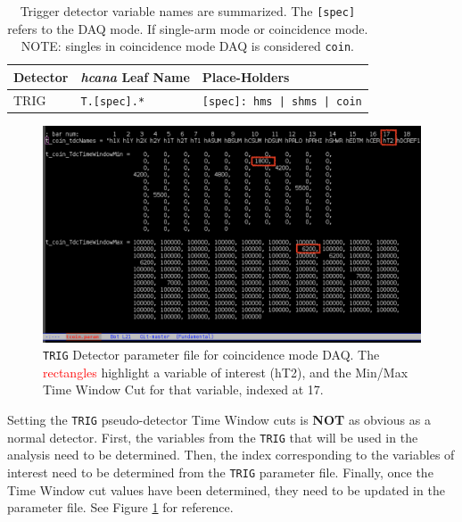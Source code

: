 \documentclass[14pt]{article}
\begin{document}
\begin{table}[h!]
\begin{tabular}{l l l}
\textbf{Detector} & \textit{hcana} \textbf{Leaf Name} & \textbf{Place-Holders} \\
\hline
TRIG & \texttt{T.[spec].*} & \texttt{[spec]: hms | shms | coin} \\
\end{tabular}
\caption{Trigger detector variable names are summarized. The \texttt{[spec]} refers to the DAQ mode. If single-arm mode or coincidence mode. NOTE: singles in
coincidence mode DAQ is considered \texttt{coin}.}
\label{tab: Table 6}
\end{table} 
\begin{figure}[H]
  \captionsetup{justification=raggedright,singlelinecheck=false}
  \includegraphics[scale=0.3]{plots/tcoin_parm.png}
  \caption{\texttt{TRIG} Detector parameter file for coincidence mode DAQ. The \textcolor{red}{rectangles} highlight a variable of interest (hT2), and the Min/Max
  Time Window Cut for that variable, indexed at 17.}
  \label{fig:tcoin_parm}
\end{figure}
\noindent Setting the \texttt{TRIG} pseudo-detector Time Window cuts is \textbf{NOT} as obvious as a normal detector. First, the variables from the \texttt{TRIG} that
will be used in the analysis need to be determined. Then, the index corresponding to the variables of interest need to be determined from the \texttt{TRIG} parameter file.
Finally, once the Time Window cut values have been determined, they need to be updated in the parameter file. See Figure \ref{fig:tcoin_parm} for reference.
\\
\end{document}
